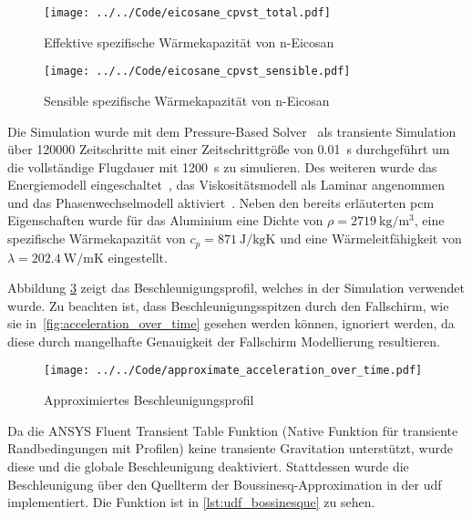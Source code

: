 \begin{figure}[H]
  \centering
  \texttt{[image: ../../Code/eicosane\_cpvst\_total.pdf]}
  \caption{Effektive spezifische Wärmekapazität von n-Eicosan}\label{fig:pcm_effective_cp}
\end{figure}

\begin{figure}[H]
  \centering
  \texttt{[image: ../../Code/eicosane\_cpvst\_sensible.pdf]}
  \caption{Sensible spezifische Wärmekapazität von n-Eicosan}\label{fig:pcm_sensible_cp}
\end{figure}

Die Simulation wurde mit dem Pressure-Based Solver~\cite{akamcae-udf} als transiente Simulation über 120000 Zeitschritte mit einer Zeitschrittgröße von \SI{0,01}{\second} durchgeführt
um die vollständige Flugdauer mit \SI{1200}{\second} zu simulieren.
Des weiteren wurde das Energiemodell eingeschaltet~\cite{akamcae-udf}, das Viskositätsmodell als Laminar angenommen~\cite{akamcae-udf} und das Phasenwechselmodell aktiviert~\cite{akamcae-udf}.
Neben den bereits erläuterten \ac{pcm} Eigenschaften wurde für das Aluminium eine Dichte von $\rho = \SI{2719}{\kilogram\per\meter\cubed}$,
eine spezifische Wärmekapazität von $c_p = \SI{871}{\joule\per\kilogram\kelvin}$ und eine Wärmeleitfähigkeit von $\lambda = \SI{202.4}{\watt\per\meter\kelvin}$
eingestellt.

Abbildung \ref{fig:approximierte_beschleunigung} zeigt das Beschleunigungsprofil, welches in der Simulation verwendet wurde. Zu beachten
ist, dass Beschleunigungsspitzen durch den Fallschirm, wie sie in~\ref{fig:acceleration_over_time} gesehen
werden können, ignoriert werden, da diese durch mangelhafte Genauigkeit der Fallschirm Modellierung resultieren.

\begin{figure}
  \centering
  \texttt{[image: ../../Code/approximate\_acceleration\_over\_time.pdf]}
  \caption{Approximiertes Beschleunigungsprofil}\label{fig:approximierte_beschleunigung}
\end{figure}

Da die ANSYS Fluent Transient Table Funktion (Native Funktion für transiente Randbedingungen mit Profilen) keine transiente Gravitation
unterstützt, wurde diese und die globale Beschleunigung deaktiviert.
Stattdessen wurde die Beschleunigung über den Quellterm der Boussinesq-Approximation in der \ac{udf} implementiert. Die Funktion ist in
\ref{lst:udf_bossinesque} zu sehen.

